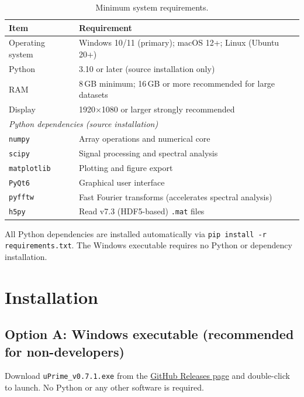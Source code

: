 \documentclass[11pt, a4paper]{report}
\begin{document}
\begin{table}[htbp]
\centering
\caption{Minimum system requirements.}
\begin{tabular}{ll}
\toprule
\textbf{Item} & \textbf{Requirement} \\
\midrule
Operating system  & Windows 10/11 (primary); macOS 12+; Linux (Ubuntu 20+) \\
Python            & 3.10 or later (source installation only) \\
RAM               & 8\,GB minimum; 16\,GB or more recommended for large datasets \\
Display           & 1920$\times$1080 or larger strongly recommended \\
\midrule
\multicolumn{2}{l}{\textit{Python dependencies (source installation)}} \\
\midrule
\texttt{numpy}      & Array operations and numerical core \\
\texttt{scipy}      & Signal processing and spectral analysis \\
\texttt{matplotlib} & Plotting and figure export \\
\texttt{PyQt6}      & Graphical user interface \\
\texttt{pyfftw}     & Fast Fourier transforms (accelerates spectral analysis) \\
\texttt{h5py}       & Read v7.3 (HDF5-based) \texttt{.mat} files \\
\bottomrule
\end{tabular}
\end{table}

\begin{notebox}
All Python dependencies are installed automatically via \texttt{pip install -r requirements.txt}. The Windows executable requires no Python or dependency installation.
\end{notebox}

\section{Installation}

\subsection{Option A: Windows executable (recommended for non-developers)}

Download \texttt{uPrime\_v0.7.1.exe} from the
\href{https://github.com/CmdrRyder/uPrime/releases}{GitHub Releases page}
and double-click to launch. No Python or any other software is required.
\end{document}
